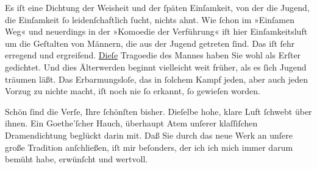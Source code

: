 \pstart
           Es iſt eine Dichtung der Weisheit und der{ }ſpäten Einſamkeit, von der die Jugend, die
               Einſamkeit{ }ſo leidenſchaftlich{ }ſucht, nichts {\pb}ahnt.
               Wie{ }ſchon im »Einſamen Weg« und neuerdings in
               der »Komoedie der Verführung« iſt hier
               Einſamkeitsluft um die Geſtalten von Männern, die aus der Jugend getreten{ }ſind. Das
               iſt{ }ſehr erregend und ergreifend. \uline{Dieſe} Tragoedie des
               Mannes haben Sie wohl als Erſter gedichtet. Und dies Älterwerden beginnt vielleicht
               weit früher, als es{ }ſich Jugend träumen läßt. Das Erbarmungsloſe, das in{ }ſolchem
               Kampf jeden, aber auch jeden Vorzug zu nichte macht, iſt noch nie{ }ſo erkannt,{ }ſo
               gewieſen worden.\pend
           
\pstart
           Schön{ }ſind die Verſe, Ihre{ }ſchönſten bisher. Dieſelbe hohe, klare Luft{ }ſchwebt über
               ihnen. Ein Goethe’ſcher Hauch, überhaupt Atem
               unſerer klaſſiſchen Dramendichtung {\pb}beglückt darin
               mit. Daß Sie durch das neue Werk an unſere große Tradition anſchließen, iſt mir beſonders, der ich ich
               mich immer darum bemüht habe, erwünſcht und wertvoll.\pend
           
